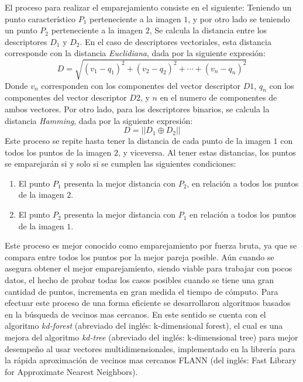 El proceso para realizar el emparejamiento consiste en el siguiente: Teniendo un punto característico $P_{1}$ perteneciente a la imagen $1$, y por otro lado se teniendo un punto $P_{2}$ perteneciente a la imagen $2$, Se calcula la distancia entre los descriptores $D_{1}$ y $D_{2}$. En el caso de descriptores vectoriales, esta distancia corresponde con la distancia \textit{Euclidiana}, dada por la siguiente expresión:
\begin{displaymath}
D = \sqrt{ (v_{1}-q_{1})^2 + (v_{2}-q_{2})^2 + \cdots + (v_{n}-q_{n})^2 }
\end{displaymath}
Donde $v_{n}$ corresponden con los componentes del vector descriptor $D1$, $q_{n}$ con los componentes del vector descriptor $D2$, y $n$ en el numero de componentes de ambos vectores. Por otro lado, para los descriptores binarios, se calcula la distancia \textit{Hamming}, dada por la siguiente expresión:
\begin{displaymath}
D = ||D_{1} \oplus D_{2}||
\end{displaymath}
Este proceso se repite hasta tener la distancia de cada punto de la imagen $1$ con todos los puntos de la imagen $2$, y viceversa. Al tener estas distancias, los puntos se emparejarán si y solo si se cumplen las siguientes condiciones: 

\begin{enumerate}[label=(\roman*)]
	\item El punto $P_{1}$ presenta la mejor distancia con $P_{2}$, en relación a todos los puntos de la imagen $2$.
	
	\item El punto $P_{2}$ presenta la mejor distancia con $P_{1}$ en relación a todos los puntos de la imagen $1$.
\end{enumerate}

Este proceso es mejor conocido como emparejamiento por fuerza bruta, ya que se compara entre todos los puntos por la mejor pareja posible. Aún cuando se asegura obtener el mejor emparejamiento, siendo viable para trabajar con pocos datos, el hecho de probar todas los casos posibles cuando se tiene una gran cantidad de puntos, incrementa en gran medida el tiempo de cómputo. Para efectuar este proceso de una forma eficiente se desarrollaron algoritmos basados en la búsqueda de vecinos mas cercanos. En este sentido se cuenta con el algoritmo \textit{kd-forest} (abreviado del inglés: k-dimensional forest), el cual es una mejora del algoritmo \textit{kd-tree} (abreviado del inglés: k-dimensional tree) para mejor desempeño al usar vectores multidimensionales, implementado en la librería para la rápida aproximación de vecinos mas cercanos FLANN \cite{flann} (del inglés: Fast Library for Approximate Nearest Neighbors).

